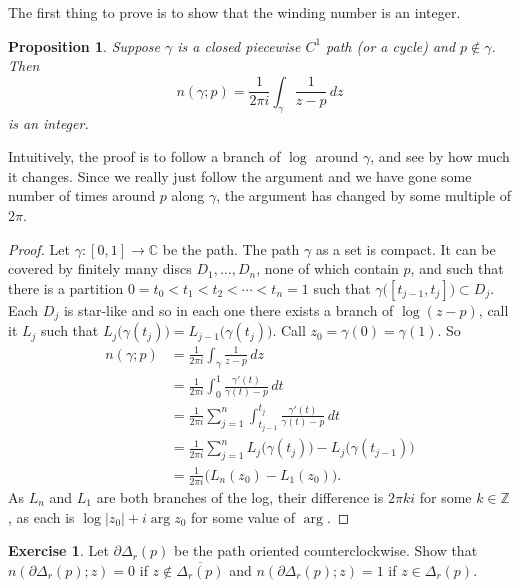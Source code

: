 \documentclass[12pt,openany]{book}
\newcommand{\sabs}[1]{\lvert {#1} \rvert}
\newcommand{\C}{{\mathbb{C}}}
\newcommand{\Z}{{\mathbb{Z}}}
\theoremstyle{plain}
\newtheorem{prop}[thm]{Proposition}
\theoremstyle{remark}
\theoremstyle{definition}
\newenvironment{exbox}{%
    \def\FrameCommand{\vrule width 1pt \relax\hspace {10pt}}%
    \MakeFramed {\advance \hsize -\width \FrameRestore }%
}{%
    \endMakeFramed
}
\theoremstyle{exercise}
\newtheorem{exercise}{Exercise}[section]
\theoremstyle{example}
\begin{document}
The first thing to prove is to show that the winding number is an integer.

\begin{prop}
Suppose $\gamma$ is a closed piecewise $C^1$ path (or a cycle)
and $p \notin \gamma$.  Then
\begin{equation*}
n(\gamma;p) = \frac{1}{2\pi i} \int_\gamma \frac{1}{z-p} \, dz
\end{equation*}
is an integer.
\end{prop}

Intuitively, the proof is to follow a branch of $\log$ around $\gamma$, and
see by how much it changes.  Since we really just follow the argument
and we have gone some number of times around $p$ along $\gamma$, the
argument has changed by some multiple of $2\pi$.

\begin{proof}
Let $\gamma \colon [0,1] \to \C$ be the path.
The path $\gamma$ as a set is compact.  It can be covered by finitely many
discs $D_1,\ldots,D_n$, none of which contain $p$, and such that there is a
partition $0 = t_0 < t_1 < t_2 < \cdots < t_n = 1$ such that
$\gamma\bigl([t_{j-1},t_j]\bigr) \subset D_j$.  Each $D_j$ is star-like and
so in each one there exists a branch of $\log (z-p)$, call it $L_j$
such that $L_j\bigl(\gamma(t_j)\bigr) = L_{j-1}\bigl(\gamma(t_j)\bigr)$.
Call $z_0 = \gamma(0) = \gamma(1)$.  So
\begin{equation*}
\begin{split}
n(\gamma;p) & =
\frac{1}{2\pi i} \int_\gamma \frac{1}{z-p} \, dz
\\
& =
\frac{1}{2\pi i} \int_0^1 \frac{\gamma'(t)}{\gamma(t)-p} \, dt
\\
& =
\frac{1}{2\pi i} \sum_{j=1}^n \int_{t_{j-1}}^{t_j} \frac{\gamma'(t)}{\gamma(t)-p} \, dt
\\
& =
\frac{1}{2\pi i} \sum_{j=1}^n L_j\bigl(\gamma(t_j)\bigr) -
L_j\bigl(\gamma(t_{j-1})\bigr)
\\
& =
\frac{1}{2\pi i} \bigl( L_n(z_0) - L_1(z_0) \Bigr) .
\end{split}
\end{equation*}
As $L_n$ and $L_1$ are both branches of the log, their difference is
$2\pi k i$ for some $k \in \Z$, as each is $\log\sabs{z_0} + i \arg z_0$ for some value of
$\arg$.
\end{proof}

\begin{exbox}
\begin{exercise} \label{exercise:windingcircle}
Let $\partial \Delta_r(p)$ be the path oriented counterclockwise.
Show that $n(\partial \Delta_r(p);z) = 0$ if $z \notin
\overline{\Delta_r(p)}$ and 
$n(\partial \Delta_r(p);z) = 1$ if $z \in \Delta_r(p)$.
\end{exercise}
\end{exbox}
\end{document}
